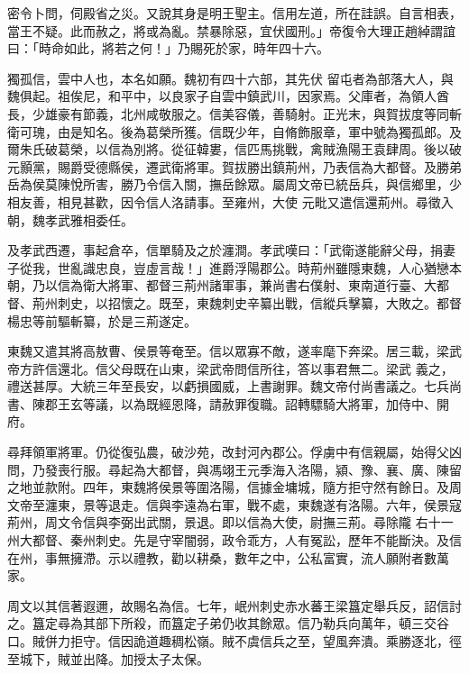 \begin{pinyinscope}
 密令卜問，伺殿省之災。又說其身是明王聖主。信用左道，所在詿誤。自言相表，當王不疑。此而赦之，將或為亂。禁暴除惡，宜伏國刑。」帝復令大理正趙綽謂誼曰：「時命如此，將若之何！」乃賜死於家，時年四十六。



 獨孤信，雲中人也，本名如願。魏初有四十六部，其先伏
 留屯者為部落大人，與魏俱起。祖俟尼，和平中，以良家子自雲中鎮武川，因家焉。父庫者，為領人酋長，少雄豪有節義，北州咸敬服之。信美容儀，善騎射。正光末，與賀拔度等同斬衛可瑰，由是知名。後為葛榮所獲。信既少年，自脩飾服章，軍中號為獨孤郎。及爾朱氏破葛榮，以信為別將。從征韓婁，信匹馬挑戰，禽賊漁陽王袁肆周。後以破元顥黨，賜爵受德縣侯，遷武衛將軍。賀拔勝出鎮荊州，乃表信為大都督。及勝弟岳為侯莫陳悅所害，勝乃令信入關，撫岳餘眾。屬周文帝已統岳兵，與信鄉里，少相友善，相見甚歡，因令信人洛請事。至雍州，大使
 元毗又遣信還荊州。尋徵入朝，魏孝武雅相委任。



 及孝武西遷，事起倉卒，信單騎及之於瀍澗。孝武嘆曰：「武衛遂能辭父母，捐妻子從我，世亂識忠良，豈虛言哉！」進爵浮陽郡公。時荊州雖隱東魏，人心猶戀本朝，乃以信為衛大將軍、都督三荊州諸軍事，兼尚書右僕射、東南道行臺、大都督、荊州刺史，以招懷之。既至，東魏刺史辛纂出戰，信縱兵擊纂，大敗之。都督楊忠等前驅斬纂，於是三荊遂定。



 東魏又遣其將高敖曹、侯景等奄至。信以眾寡不敵，遂率麾下奔梁。居三載，梁武帝方許信還北。信父母既在山東，梁武帝問信所往，答以事君無二。梁武
 義之，禮送甚厚。大統三年至長安，以虧損國威，上書謝罪。魏文帝付尚書議之。七兵尚書、陳郡王玄等議，以為既經恩降，請赦罪復職。詔轉驃騎大將軍，加侍中、開府。



 尋拜領軍將軍。仍從復弘農，破沙苑，改封河內郡公。俘虜中有信親屬，始得父凶問，乃發喪行服。尋起為大都督，與馮翊王元季海入洛陽，潁、豫、襄、廣、陳留之地並款附。四年，東魏將侯景等圍洛陽，信據金墉城，隨方拒守然有餘日。及周文帝至瀍東，景等退走。信與李遠為右軍，戰不處，東魏遂有洛陽。六年，侯景寇荊州，周文令信與李弼出武關，景退。即以信為大使，尉撫三荊。尋除隴
 右十一州大都督、秦州刺史。先是守宰闇弱，政令乖方，人有冤訟，歷年不能斷決。及信在州，事無擁滯。示以禮教，勸以耕桑，數年之中，公私富實，流人願附者數萬家。



 周文以其信著遐邇，故賜名為信。七年，岷州刺史赤水蕃王梁簋定舉兵反，詔信討之。簋定尋為其部下所殺，而簋定子弟仍收其餘眾。信乃勒兵向萬年，頓三交谷口。賊併力拒守。信因詭道趣稠松嶺。賊不虞信兵之至，望風奔潰。乘勝逐北，徑至城下，賊並出降。加授太子太保。




\end{pinyinscope}
